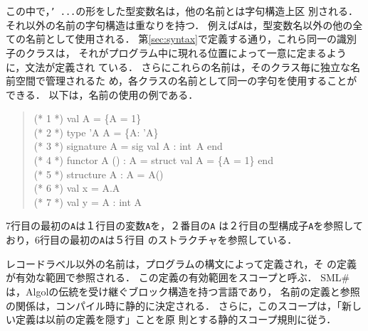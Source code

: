 \documentclass{jbook}
\newcommand{\smlsharp}{SML\#}
\newcommand{\code}[1]{\mbox{\large\tt #1}}
\newenvironment{program}{\begin{quote}\begin{tt}}%
                        {\end{tt}\end{quote}}
\begin{document}
	この中で，\code{' ...}の形をした型変数名は，他の名前とは字句構造上区
別される．
	それ以外の名前の字句構造は重なりを持つ．
	例えば\code{A}は，型変数名以外の他の全ての名前として使用される．
	第\ref{sec:syntax}で定義する通り，これら同一の識別子のクラスは，
それがプログラム中に現れる位置によって一意に定まるように，文法が定義され
ている．
	さらにこれらの名前は，そのクラス毎に独立な名前空間で管理されるた
め，各クラスの名前として同一の字句を使用することができる．
	以下は，名前の使用の例である．
\begin{program}
(* 1 *) val A = \{A = 1\}\\
(* 2 *) type 'A A =  \{A: 'A\}\\
(* 3 *) signature A = sig val A : int\ A end\\
(* 4 *) functor A () : A = struct val A = \{A = 1\} end\\
(* 5 *) structure A : A = A()\\
(* 6 *) val x = A.A\\
(* 7 *) val y = A : int A
\end{program}
	7行目の最初の\code{A}は１行目の変数\code{A}を，２番目の\code{A}
は２行目の型構成子\code{A}を参照しており，6行目の最初の\code{A}は５行目
のストラクチャを参照している．

	レコードラベル以外の名前は，プログラムの構文によって定義され，そ
の定義が有効な範囲で参照される．
	この定義の有効範囲をスコープと呼ぶ．
	\smlsharp{}は，Algolの伝統を受け継ぐブロック構造を持つ言語であり，
名前の定義と参照の関係は，コンパイル時に静的に決定される．
	さらに，このスコープは，「新しい定義は以前の定義を隠す」ことを原
則とする静的スコープ規則に従う．
\end{document}
